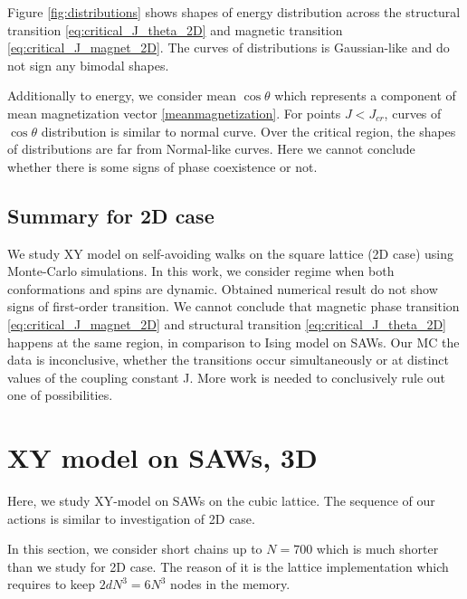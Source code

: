 Figure \ref{fig:distributions} shows shapes of energy distribution across the structural transition \eqref{eq:critical_J_theta_2D} and magnetic transition  \eqref{eq:critical_J_magnet_2D}. The curves of distributions is Gaussian-like and do not sign any bimodal shapes. 

Additionally to energy, we consider mean $\cos \theta$ which represents a component of mean magnetization vector \eqref{meanmagnetization}. For points $J < J_{cr}$, curves of $\cos \theta$ distribution is similar to normal curve. Over the critical region, the shapes of distributions are far from Normal-like curves. Here we cannot conclude whether there is some signs of phase coexistence or not.  





\subsection{Summary for 2D case}
We study XY model on self-avoiding walks on the square lattice (2D case) using Monte-Carlo simulations. In this work, we consider regime when both conformations and spins are dynamic. Obtained numerical result do not show signs of first-order transition.  We cannot conclude that magnetic phase transition \eqref{eq:critical_J_magnet_2D} and structural transition \eqref{eq:critical_J_theta_2D}  happens at the same region, in comparison to Ising model on SAWs. Our MC the data is inconclusive, whether the transitions occur simultaneously or at distinct values of the coupling constant J. More work is needed to conclusively rule out one of possibilities.


\section{XY model on SAWs, 3D}
Here, we study XY-model on SAWs on the cubic lattice. The sequence of our actions is similar to investigation of 2D case. 

In this section, we consider short chains up to $N=700$ which is much shorter than we study for 2D case. The reason of it is the lattice implementation which requires to keep $2dN^3=6N^3$ nodes in the memory.

